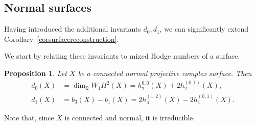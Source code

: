 \documentclass{amsart}
\theoremstyle{plain}
\newtheorem{prop}{Proposition}[section]
\theoremstyle{definition}
\newcommand{\bbQ}{\mathbb{Q}}
\begin{document}
\subsection{Normal surfaces}
\label{secnormalsurfacereconstruction}

Having introduced the additional invariants $d_0,d_1$, we can significantly extend Corollary~\ref{corsurfacereconstruction}.

We start by relating these invariants to mixed Hodge numbers of a surface.

\begin{prop}\label{propsurfacetopologicaldefects}
Let $X$ be a connected normal projective complex surface. Then
\begin{equation}\label{eqsurfacetopologicaldefects}
\begin{aligned}
d_0(X)&=\dim_{\bbQ}W_1H^2(X)
       =h_2^{0,0}(X)+2h_2^{(0,1)}(X),\\
d_1(X)&=b_3(X)-b_1(X)
       =2h_3^{(1,2)}(X)-2h_1^{(0,1)}(X).
\end{aligned}
\end{equation}
\end{prop}

Note that, since $X$ is connected and normal, it is irreducible.
\end{document}
